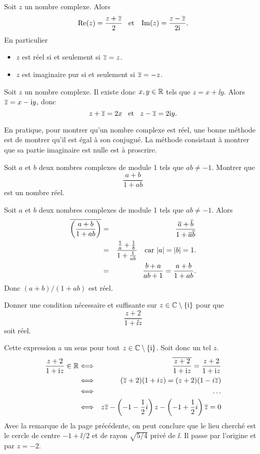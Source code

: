 \documentclass{magnolia}
\begin{document}
\begin{proposition}[utile=-3]
Soit $z$ un nombre complexe. Alors
\[\mathop{\rm Re}(z)=\frac{z+\overline{z}}{2} \quad\!\text{et}\quad\!
  \mathop{\rm Im}(z)=\frac{z-\overline{z}}{2{\rm i}}.\]
En particulier
\begin{itemize}
\item $z$ est réel si et seulement si $\overline{z}=z$.
\item $z$ est imaginaire pur si et seulement si $\overline{z}=-z$.
\end{itemize}
\end{proposition}
\begin{preuve}
Soit $z$ un nombre complexe. Il existe donc $x,y\in\mathbb{R}$ tels que $z=x+\ii y$. Alors $\overline{z}=x-{\rm i} y$, donc
\[z+\overline{z}=2x \quad\!\text{et}\quad\! z-\overline{z}=2{\rm i} y.\]
\end{preuve}

\begin{remarqueUnique}
\remarque En pratique, pour montrer qu'un nombre complexe est réel, une
  bonne méthode est de montrer qu'il est égal à son conjugué. La méthode
  consistant à montrer que sa partie imaginaire est nulle est à proscrire.
\end{remarqueUnique}

\begin{exos}
\exo Soit $a$ et $b$ deux nombres complexes de module 1 tels que $ab\neq -1$. Montrer que
  \[\frac{a+b}{1+ab}\]
  est un nombre réel.
\begin{sol}
Soit $a$ et $b$ deux nombres complexes de module 1 tels que $ab\neq -1$. Alors
\begin{eqnarray*}
\overline{\left(\frac{a+b}{1+ab}\right)}
&=& \frac{\overline{a}+\overline{b}}{1+\overline{a}\overline{b}}\\
&=& \frac{\frac{1}{a}+\frac{1}{b}}{1+\frac{1}{ab}} \quad \text{car $\left|a\right|=\left|b\right|=1$.}\\
&=& \frac{b+a}{ab+1} = \frac{a+b}{1+ab}.
\end{eqnarray*}
Donc $(a+b)/(1+ab)$ est réel.
\end{sol}
\exo Donner une condition nécessaire et suffisante sur $z\in\mathbb{C}\setminus\left\{{\rm i}\right\}$ pour que
  \[\frac{z+2}{1+\ii z}\]
  soit réel.
  \begin{sol}
Cette expression a un sens pour tout $z\in\mathbb{C}\setminus\left\{{\rm i}\right\}$. Soit donc un tel $z$.
\begin{eqnarray*}
 \frac{z+2}{1+{\rm i} z} \in \mathbb{R}&\Longleftrightarrow &\overline{\frac{z+2}{1+{\rm i} z}}=\frac{z+2}{1+{\rm i} z}\\
 &\Longleftrightarrow & (\overline{z}+2)(1+iz)=(z+2)(1-i\overline{z})\\
 &\Longleftrightarrow & \ldots \\
 &\Longleftrightarrow & z\overline{z}-\left(-1-\frac{1}{2}i\right)z-\left(-1+\frac{1}{2}i\right)\overline{z}=0 
 \end{eqnarray*}
Avec la remarque de la page précédente, on peut conclure que le lieu cherché est le cercle de centre $-1+\ii/2$ et de rayon $\sqrt{5/4}$ privé de $\ii$. Il passe par l'origine et par $z=-2$. 
  \end{sol}
\end{exos}
\end{document}
